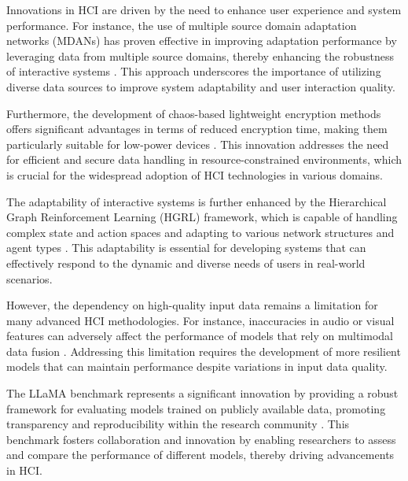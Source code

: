 Innovations in HCI are driven by the need to enhance user experience and system performance. For instance, the use of multiple source domain adaptation networks (MDANs) has proven effective in improving adaptation performance by leveraging data from multiple source domains, thereby enhancing the robustness of interactive systems \cite{zhao2017multiplesourcedomainadaptation}. This approach underscores the importance of utilizing diverse data sources to improve system adaptability and user interaction quality.



Furthermore, the development of chaos-based lightweight encryption methods offers significant advantages in terms of reduced encryption time, making them particularly suitable for low-power devices \cite{shah2022novelchaosbasedlightweightimage}. This innovation addresses the need for efficient and secure data handling in resource-constrained environments, which is crucial for the widespread adoption of HCI technologies in various domains.



The adaptability of interactive systems is further enhanced by the Hierarchical Graph Reinforcement Learning (HGRL) framework, which is capable of handling complex state and action spaces and adapting to various network structures and agent types \cite{chen2024adaptivenetworkinterventioncomplex}. This adaptability is essential for developing systems that can effectively respond to the dynamic and diverse needs of users in real-world scenarios.



However, the dependency on high-quality input data remains a limitation for many advanced HCI methodologies. For instance, inaccuracies in audio or visual features can adversely affect the performance of models that rely on multimodal data fusion \cite{zhou2023leveragingtcntransformereffective}. Addressing this limitation requires the development of more resilient models that can maintain performance despite variations in input data quality.



The LLaMA benchmark represents a significant innovation by providing a robust framework for evaluating models trained on publicly available data, promoting transparency and reproducibility within the research community \cite{touvron2023llama}. This benchmark fosters collaboration and innovation by enabling researchers to assess and compare the performance of different models, thereby driving advancements in HCI.



